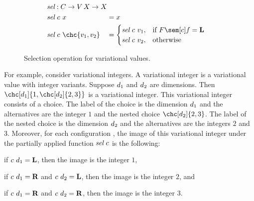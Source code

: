 \begin{figure}[H]
  \onehalfspacing
  \begin{alignat*}{2}
    &\mathrlap{\sel : \cS \to \Var[\Val] \to \Val} \\
    &\sel\ \cE\ \val &&= \val \\
    &\sel\ \cE\ \chc{\var_1, \var_2} &&=
    \begin{cases}
      \sel\ \cE\ \var_1, & \text{if }\fSem[\cE]{\fE} = \tagL \\
      \sel\ \cE\ \var_2, & \text{otherwise}%
    \end{cases}
  \end{alignat*}
  \caption{Selection operation for variational values.}
  \label{fig:vsel}
\end{figure}

For example, consider variational integers.
A variational integer is a variational value with integer variants.
Suppose $\color{black}d_1$ and $\color{black}d_2$ are dimensions.
Then $\chc[\dE_1]{1,\chc[\dE_2]{2,3}}$ is a variational integer.
This variational integer consists of a choice.
The label of the choice is the dimension $\color{black}d_1$ and the alternatives are the integer $1$ and the nested choice $\chc[\dE_2]{2,3}$.
The label of the nested choice is the dimension $\color{black}d_2$ and the alternatives are the integers $2$ and $3$.
Moreover, for each configuration \cE, the image of this variational integer under the partially applied function $\color{black}\textit{sel}\ \color{black}c$ is the following:
%
\begin{inparaenum}[(1)]
  \item if $\color{black}c\ \color{black}d_1 = \color{black}\mathbf{L}$, then the image is the integer $1$,
  \item if $\color{black}c\ \color{black}d_1 = \color{black}\mathbf{R}$ and $\color{black}c\ \color{black}d_2 = \color{black}\mathbf{L}$, then the image is the integer $2$, and
  \item if $\color{black}c\ \color{black}d_1 = \color{black}\mathbf{R}$ and $\color{black}c\ \color{black}d_2 = \color{black}\mathbf{R}$, then the image is the integer $3$.
\end{inparaenum}

